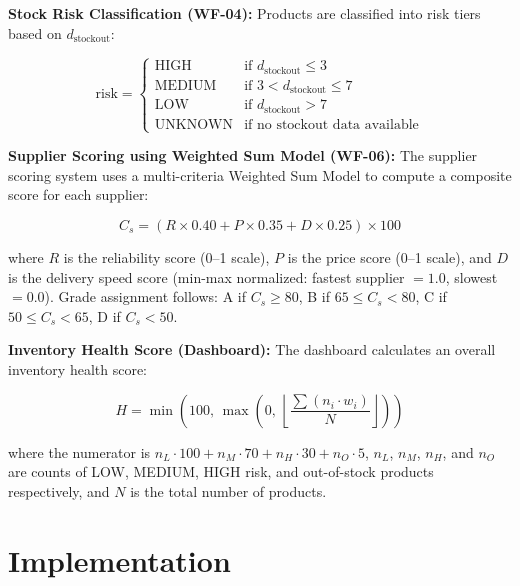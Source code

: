 \documentclass[journal]{IEEEtran}
\begin{document}
\textbf{Stock Risk Classification (WF-04):}
Products are classified into risk tiers based on $d_{\text{stockout}}$:

\begin{equation}
\label{eq:risk_classification}
\text{risk} =
\begin{cases}
\text{HIGH}    & \text{if } d_{\text{stockout}} \leq 3 \\
\text{MEDIUM}  & \text{if } 3 < d_{\text{stockout}} \leq 7 \\
\text{LOW}     & \text{if } d_{\text{stockout}} > 7 \\
\text{UNKNOWN} & \text{if no stockout data available}
\end{cases}
\end{equation}

\textbf{Supplier Scoring using Weighted Sum Model (WF-06):}
The supplier scoring system uses a multi-criteria Weighted Sum Model to compute a composite score for each supplier:

\begin{equation}
\label{eq:supplier_scoring}
C_s = (R \times 0.40 + P \times 0.35 + D \times 0.25) \times 100
\end{equation}

where $R$ is the reliability score (0--1 scale), $P$ is the price score (0--1 scale), and $D$ is the delivery speed score (min-max normalized: fastest supplier $= 1.0$, slowest $= 0.0$). Grade assignment follows: A if $C_s \geq 80$, B if $65 \leq C_s < 80$, C if $50 \leq C_s < 65$, D if $C_s < 50$.

\textbf{Inventory Health Score (Dashboard):}
The dashboard calculates an overall inventory health score:

\begin{equation}
\label{eq:health_score}
H = \min\!\left(100,\, \max\!\left(0,\, \left\lfloor \frac{\sum (n_i \cdot w_i)}{N} \right\rfloor\right)\right)
\end{equation}

where the numerator is $n_L \cdot 100 + n_M \cdot 70 + n_H \cdot 30 + n_O \cdot 5$, $n_L$, $n_M$, $n_H$, and $n_O$ are counts of LOW, MEDIUM, HIGH risk, and out-of-stock products respectively, and $N$ is the total number of products.

\section{Implementation}
\end{document}
